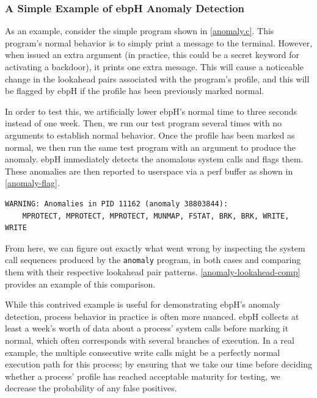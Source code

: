 \documentclass[
  12pt]{findlay}
\newcommand{\passthrough}[1]{#1}
\begin{document}
\hypertarget{a-simple-example-of-ebph-anomaly-detection}{%
\subsubsection{A Simple Example of ebpH Anomaly
Detection}\label{a-simple-example-of-ebph-anomaly-detection}}

As an example, consider the simple program shown in \autoref{anomaly.c}.
This program's normal behavior is to simply print a message to the
terminal. However, when issued an extra argument (in practice, this
could be a secret keyword for activating a backdoor), it prints one
extra message. This will cause a noticeable change in the lookahead
pairs associated with the program's profile, and this will be flagged by
ebpH if the profile has been previously marked normal.

\protect\enlargethispage*{\baselineskip}


In order to test this, we artificially lower ebpH's normal time to three
seconds instead of one week. Then, we run our test program several times
with no arguments to establish normal behavior. Once the profile has
been marked as normal, we then run the same test program with an
argument to produce the anomaly. ebpH immediately detects the anomalous
system calls and flags them. These anomalies are then reported to
userspace via a perf buffer as shown in \autoref{anomaly-flag}.

\begin{lstlisting}[label={anomaly-flag}, caption={The flagged anomaly in the \texttt{anomaly}
binary as shown in the ebpH logs. Note that ebpH also logs the offending sequence, reordering it
so that most recent system calls appear on the right.}, language=none]
WARNING: Anomalies in PID 11162 (anomaly 38803844):
    MPROTECT, MPROTECT, MPROTECT, MUNMAP, FSTAT, BRK, BRK, WRITE, WRITE
\end{lstlisting}

From here, we can figure out exactly what went wrong by inspecting the
system call sequences produced by the \passthrough{\lstinline!anomaly!}
program, in both cases and comparing them with their respective
lookahead pair patterns. \autoref{anomaly-lookahead-comp} provides an
example of this comparison.

While this contrived example is useful for demonstrating ebpH's anomaly
detection, process behavior in practice is often more nuanced. ebpH
collects at least a week's worth of data about a process' system calls
before marking it normal, which often corresponds with several branches
of execution. In a real example, the multiple consecutive write calls
might be a perfectly normal execution path for this process; by ensuring
that we take our time before deciding whether a process' profile has
reached acceptable maturity for testing, we decrease the probability of
any false positives.
\end{document}
